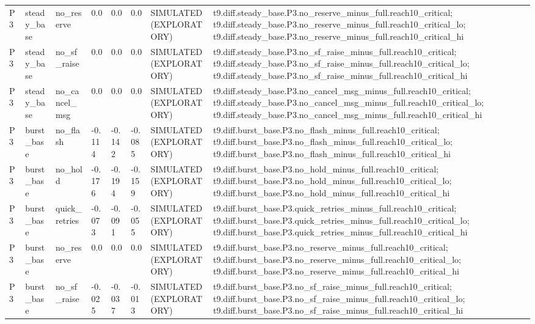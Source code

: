 \begin{table}[t]
\begin{tabular}{llllllll}
P3 & steady\_base & no\_reserve & 0.0 & 0.0 & 0.0 & SIMULATED (EXPLORATORY) & t9.diff.steady\_base.P3.no\_reserve\_minus\_full.reach10\_critical; t9.diff.steady\_base.P3.no\_reserve\_minus\_full.reach10\_critical\_lo; t9.diff.steady\_base.P3.no\_reserve\_minus\_full.reach10\_critical\_hi \\
P3 & steady\_base & no\_sf\_raise & 0.0 & 0.0 & 0.0 & SIMULATED (EXPLORATORY) & t9.diff.steady\_base.P3.no\_sf\_raise\_minus\_full.reach10\_critical; t9.diff.steady\_base.P3.no\_sf\_raise\_minus\_full.reach10\_critical\_lo; t9.diff.steady\_base.P3.no\_sf\_raise\_minus\_full.reach10\_critical\_hi \\
P3 & steady\_base & no\_cancel\_msg & 0.0 & 0.0 & 0.0 & SIMULATED (EXPLORATORY) & t9.diff.steady\_base.P3.no\_cancel\_msg\_minus\_full.reach10\_critical; t9.diff.steady\_base.P3.no\_cancel\_msg\_minus\_full.reach10\_critical\_lo; t9.diff.steady\_base.P3.no\_cancel\_msg\_minus\_full.reach10\_critical\_hi \\
P3 & burst\_base & no\_flash & -0.114 & -0.142 & -0.085 & SIMULATED (EXPLORATORY) & t9.diff.burst\_base.P3.no\_flash\_minus\_full.reach10\_critical; t9.diff.burst\_base.P3.no\_flash\_minus\_full.reach10\_critical\_lo; t9.diff.burst\_base.P3.no\_flash\_minus\_full.reach10\_critical\_hi \\
P3 & burst\_base & no\_hold & -0.176 & -0.194 & -0.159 & SIMULATED (EXPLORATORY) & t9.diff.burst\_base.P3.no\_hold\_minus\_full.reach10\_critical; t9.diff.burst\_base.P3.no\_hold\_minus\_full.reach10\_critical\_lo; t9.diff.burst\_base.P3.no\_hold\_minus\_full.reach10\_critical\_hi \\
P3 & burst\_base & quick\_retries & -0.073 & -0.091 & -0.055 & SIMULATED (EXPLORATORY) & t9.diff.burst\_base.P3.quick\_retries\_minus\_full.reach10\_critical; t9.diff.burst\_base.P3.quick\_retries\_minus\_full.reach10\_critical\_lo; t9.diff.burst\_base.P3.quick\_retries\_minus\_full.reach10\_critical\_hi \\
P3 & burst\_base & no\_reserve & 0.0 & 0.0 & 0.0 & SIMULATED (EXPLORATORY) & t9.diff.burst\_base.P3.no\_reserve\_minus\_full.reach10\_critical; t9.diff.burst\_base.P3.no\_reserve\_minus\_full.reach10\_critical\_lo; t9.diff.burst\_base.P3.no\_reserve\_minus\_full.reach10\_critical\_hi \\
P3 & burst\_base & no\_sf\_raise & -0.025 & -0.037 & -0.013 & SIMULATED (EXPLORATORY) & t9.diff.burst\_base.P3.no\_sf\_raise\_minus\_full.reach10\_critical; t9.diff.burst\_base.P3.no\_sf\_raise\_minus\_full.reach10\_critical\_lo; t9.diff.burst\_base.P3.no\_sf\_raise\_minus\_full.reach10\_critical\_hi \\

\end{tabular}
\end{table}

